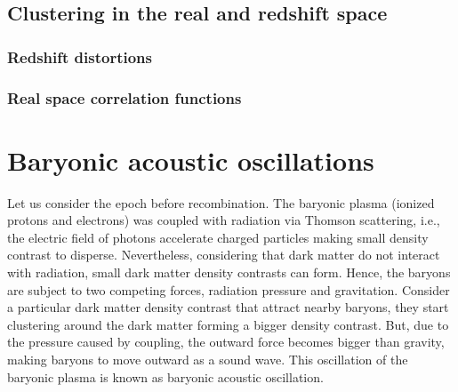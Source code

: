 \subsection{ Clustering in the real and redshift space }


\subsubsection{ Redshift distortions }
\subsubsection{ Real space correlation functions }

\section{ Baryonic acoustic oscillations }
Let us consider the epoch before recombination. The baryonic plasma (ionized protons and electrons) was coupled with radiation via 
Thomson scattering,  i.e., the electric field of photons accelerate charged particles making small density contrast to disperse. Nevertheless,
considering that dark matter do not interact with radiation, small dark matter density contrasts can form. Hence, the baryons are 
subject to two competing forces, radiation pressure and gravitation. Consider a particular dark matter density contrast that attract
nearby baryons, they start clustering around the dark matter forming a bigger density contrast. But, due to the pressure caused
by coupling, the outward force becomes bigger than gravity, making baryons to move outward as a sound wave. This oscillation 
of the baryonic plasma is known as baryonic acoustic oscillation. 

